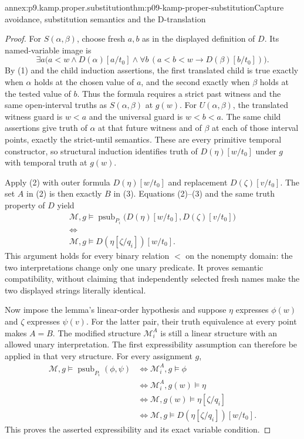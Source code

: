 \begin{annexitem}{annex:p9.kamp.proper.substitution}{thm:p09-kamp-proper-substitution}{Capture avoidance, substitution semantics and the D-translation}
\begin{proof}
For \(S(\alpha,\beta)\), choose fresh \(a,b\) as in the displayed
definition of \(D\). Its named-variable image is
\[
 \exists a\bigl(a<w\land D(\alpha)[a/t_0]
    \land\forall b\,(a<b<w\to D(\beta)[b/t_0])\bigr).
\]
By (1) and the child induction assertions, the first translated child
is true exactly when \(\alpha\) holds at the chosen value of \(a\),
and the second exactly when \(\beta\) holds at the tested value of
\(b\). Thus the formula requires a strict past witness and the same
open-interval truths as \(S(\alpha,\beta)\) at \(g(w)\).
For \(U(\alpha,\beta)\), the translated witness guard is \(w<a\)
and the universal guard is \(w<b<a\). The same child assertions give
truth of \(\alpha\) at that future witness and of \(\beta\) at
each of those interval points, exactly the strict-until semantics.
These are every primitive temporal constructor, so structural induction
identifies truth of \(D(\eta)[w/t_0]\) under \(g\) with temporal
truth at \(g(w)\).

Apply (2) with outer formula
\(D(\eta)[w/t_0]\) and replacement \(D(\zeta)[v/t_0]\).
The set \(A\) in (2) is then exactly \(B\) in (3). Equations
(2)--(3) and the same truth property of \(D\) yield
\[
\begin{gathered}
 \mathcal M,g\models
  \operatorname{psub}_{P_i}
       \bigl(D(\eta)[w/t_0],D(\zeta)[v/t_0]\bigr)\\
 \Longleftrightarrow\\
 \mathcal M,g\models D(\eta[\zeta/q_i])[w/t_0].
\end{gathered}
\tag{4}
\]
This argument holds for every binary relation \(<\) on the nonempty
domain: the two interpretations change only one unary predicate. It proves
semantic compatibility, without claiming that independently selected fresh
names make the two displayed strings literally identical.

Now impose the lemma's linear-order hypothesis and suppose \(\eta\)
expresses \(\phi(w)\) and \(\zeta\) expresses \(\psi(v)\).
For the latter pair, their truth equivalence at every point makes
\(A=B\). The modified structure \(\mathcal M_i^A\) is still a
linear structure with an allowed unary interpretation. The first
expressibility assumption can therefore be applied in that very
structure. For every assignment \(g\),
\[
\begin{aligned}
 \mathcal M,g\models\operatorname{psub}_{P_i}(\phi,\psi)
 &\Longleftrightarrow\mathcal M_i^A,g\models\phi\\
 &\Longleftrightarrow\mathcal M_i^A,g(w)\models\eta\\
 &\Longleftrightarrow\mathcal M,g(w)\models\eta[\zeta/q_i]\\
 &\Longleftrightarrow
       \mathcal M,g\models D(\eta[\zeta/q_i])[w/t_0].
\end{aligned}
\tag{5}
\]
This proves the asserted expressibility and its exact variable condition.


\end{proof}
\end{annexitem}
